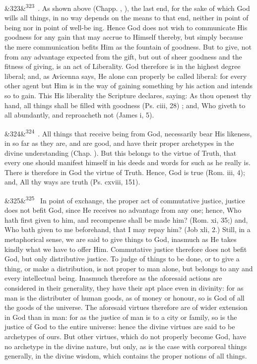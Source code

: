 \documentclass[12pt]{article}
\newcommand{\para}[1][]{\par\noindent\ifx&#1&\else\textsuperscript{\footnotesize #1}~\fi}
\begin{document}
\para[323] 6. As shown above (Chapp. , ), the last end, for the sake of which God wills all things, in no way depends on the means to that end, neither in point of being nor in point of well-be ing. Hence God does not wish to communicate His goodness for any gain that may accrue to Himself thereby, but simply because the mere communication befits Him as the fountain of goodness. But to give, not from any advantage expected from the gift, but out of sheer goodness and the fitness of giving, is an act of Liberality. God therefore is in the highest degree liberal; and, as Avicenna says, He alone can properly be called liberal: for every other agent but Him is in the way of gaining something by his action and intends so to gain. This His liberality the Scripture declares, saying: As thou openest thy hand, all things shall be filled with goodness (Ps. ciii, 28) ; and, Who giveth to all abundantly, and reproacheth not (James i, 5).

\para[324] 7. All things that receive being from God, necessarily bear His likeness, in so far as they are, and are good, and have their proper archetypes in the divine understanding (Chap. ). But this belongs to the virtue of Truth, that every one should manifest himself in his deeds and words for such as he really is. There is therefore in God the virtue of Truth. Hence, God is true (Rom. iii, 4); and, All thy ways are truth (Ps. cxviii, 151).

\para[325] In point of exchange, the proper act of commutative justice, justice does not befit God, since He receives no advantage from any one; hence, Who hath first given to him, and recompense shall be made him? (Rom. xi, 35;) and, Who bath given to me beforehand, that I may repay him? (Job xli, 2.) Still, in a metaphorical sense, we are said to give things to God, inasmuch as He takes kindly what we have to offer Him. Commutative justice therefore does not befit God, but only distributive justice. To judge of things to be done, or to give a thing, or make a distribution, is not proper to man alone, but belongs to any and every intellectual being. Inasmuch therefore as the aforesaid actions are considered in their generality, they have their apt place even in divinity: for as man is the distributer of human goods, as of money or honour, so is God of all the goods of the universe. The aforesaid virtues therefore are of wider extension in God than in man: for as the justice of man is to a city or family, so is the justice of God to the entire universe: hence the divine virtues are said to be archetypes of ours. But other virtues, which do not properly become God, have no archetype in the divine nature, but only, as is the case with corporeal things generally, in the divine wisdom, which contains the proper notions of all things.
\end{document}
